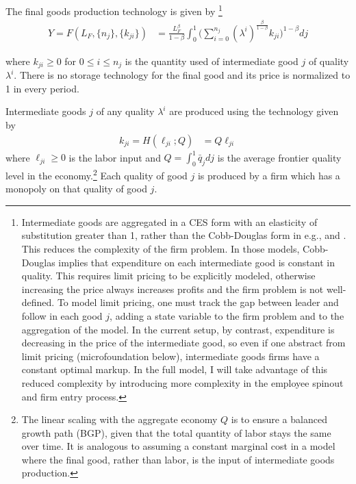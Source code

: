 \documentclass[11pt,english]{article}
\begin{document}
The final goods production technology is given by \footnote{Intermediate goods are aggregated in a CES form with an elasticity of substitution greater than 1, rather than the Cobb-Douglas form in e.g., \cite{grossman_quality_1991} and \cite{baslandze_spinout_2019}. This reduces the complexity of the firm problem. In those models, Cobb-Douglas implies that expenditure on each intermediate good is constant in quality. This requires limit pricing to be explicitly modeled, otherwise increasing the price always increases profits and the firm problem is not well-defined. To model limit pricing, one must track the gap between leader and follow in each good $j$, adding a state variable to the firm problem and to the aggregation of the model. In the current setup, by contrast, expenditure is decreasing in the price of the intermediate good, so even if one abstract from limit pricing (microfoundation below), intermediate goods firms have a constant optimal markup. In the full model, I will take advantage of this reduced complexity by introducing more complexity in the employee spinout and firm entry process.}
\begin{align}
Y = F(L_F,\{n_j\},\{k_{ji}\}) &= \frac{L_F^{\beta}}{1-\beta} \int_0^1 \Big(\sum_{i = 0}^{n_{j}} (\lambda^{i})^{\frac{\beta}{1-\beta}} k_{ji} \Big)^{1-\beta} dj \label{final_goods_production}
\end{align}

where $k_{ji} \ge 0$ for $0 \le i \le n_j$ is the quantity used of intermediate good $j$ of quality $\lambda^i$. There is no storage technology for the final good and its price is normalized to 1 in every period. 

Intermediate goods $j$ of any quality $\lambda^i$ are produced using the technology given by 
\begin{align}
k_{ji} = H(\ell_{ji};Q) &= Q \ell_{ji} \label{intermediate_goods_production}
\end{align}
where $\ell_{ji} \ge 0$ is the labor input and $Q = \int_0^1 \bar{q}_{j} dj$ is the average frontier quality level in the economy.\footnote{The linear scaling with the aggregate economy $Q$ is to ensure a balanced growth path (BGP), given that the total quantity of labor stays the same over time. It is analogous to assuming a constant marginal cost in a model where the final good, rather than labor, is the input of intermediate goods production.} Each quality of good $j$ is produced by a firm which has a monopoly on that quality of good $j$. 
\end{document}

